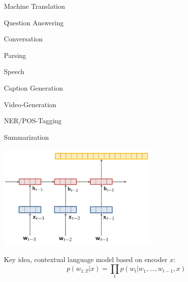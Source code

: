 \documentclass{beamer}
\let\tempone\itemize
\let\temptwo\enditemize
\renewenvironment{itemize}{\tempone\addtolength{\itemsep}{0.5\baselineskip}}{\temptwo}
\newcommand{\air}{\vspace{0.25cm}}
\newcommand{\Cite}[1]{{\footnotesize \citep{#1}}}
\begin{document}
\begin{frame}{}
  \begin{center}
  \end{center}

  \begin{itemize}
  \item \alert<2>{Machine Translation} \Cite{kalchbrenner2013recurrent,sutskever2014sequence, Cho2014, bahdanau2014neural,luong15effective} 
    \air

   
  \item Question Answering \Cite{Hermann2015} 
  \item Conversation \Cite{Vinyals2015} \Cite{Serban2016}
  \item Parsing \Cite{vinyals15grammar}
  \item Speech \Cite{Chorowski2015,Chan2015}
  \item Caption Generation \Cite{karpathy2015deep,Xu2015,Vinyals2015b}
  \item Video-Generation \Cite{Srivastava2015a}
  \item NER/POS-Tagging \Cite{Gillick2016}
  \item Summarization \Cite{Rush2015} 
    \air 

  \end{itemize}  
\end{frame}


\begin{frame}
  \begin{center}
  \end{center}
    \air 
   
    \begin{center}
      \includegraphics[width=0.6\textwidth]{rnnlm6}
    \end{center}
  \begin{itemize}
  \item Key idea, contextual language model based on encoder $x$: 
  \end{itemize}
  \[ p(w_{1:T} | x) = \prod_{t} p(w_t | w_1, \ldots, w_{t-1}, x) \] 
  
\end{frame}
\end{document}
